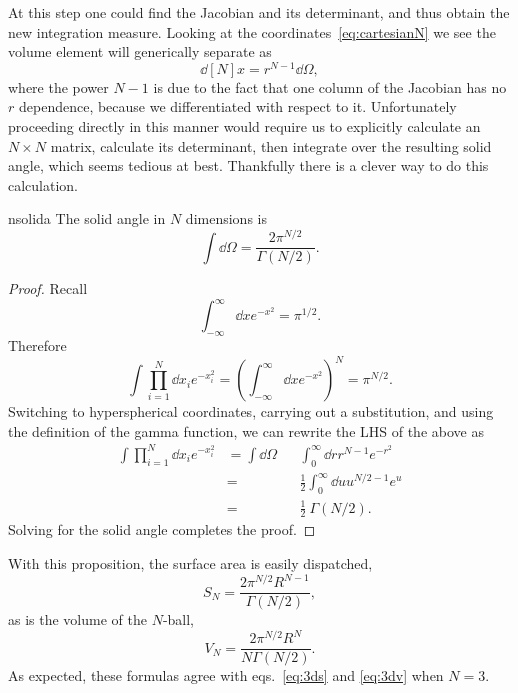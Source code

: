 At this step one could find the Jacobian and its determinant, and thus obtain
the new integration measure. Looking at the coordinates~\eqref{eq:cartesianN}
we see the volume element will generically separate as
\begin{equation}
  \dd[N]{x}=r^{N-1}\dd{\Omega},
\end{equation}
where the power $N-1$ is due to the fact that one column of the Jacobian has no
$r$ dependence, because we differentiated with respect to it. Unfortunately
proceeding directly in this manner would require us to explicitly calculate an
$N\times N$ matrix, calculate its determinant, then integrate over the
resulting solid angle, which seems tedious at best.
Thankfully there is a clever way to do this calculation. 

\begin{proposition}{}{nsolida}
The solid angle in $N$ dimensions is
$$
  \int\dd{\Omega}=\frac{2\pi^{N/2}}{\Gamma(N/2)}.
$$
\begin{proof}
  Recall 
  $$
    \int_{-\infty}^\infty\dd{x}e^{-x^2}=\pi^{1/2}.
  $$
  Therefore
  $$ 
    \int\prod_{i=1}^N\dd{x_i}e^{-x_i^2} 
      =\left(\int_{-\infty}^\infty\dd{x}e^{-x^2}\right)^N=\pi^{N/2}.
  $$
  Switching to hyperspherical coordinates, carrying out
  a substitution, and using the definition of the gamma function,
  we can rewrite the LHS of the above as
  \begin{equation*}\begin{aligned}
    \int\prod_{i=1}^N\dd{x_i}e^{-x_i^2}
       &=\int\dd{\Omega}&&\int_0^\infty\dd{r}r^{N-1}e^{-r^2}\\
       &=&&\frac{1}{2}\int_0^\infty\dd{u}u^{N/2-1}e^u\\
       &=&&\frac{1}{2}~\Gamma(N/2).
  \end{aligned}\end{equation*}
  Solving for the solid angle completes the proof. 
\end{proof}
\end{proposition}
With this proposition, the surface area is easily dispatched,
\begin{equation}
  S_N=\frac{2\pi^{N/2}R^{N-1}}{\Gamma(N/2)},
\end{equation}
as is the volume of the $N$-ball,
\begin{equation}
  V_N=\frac{2\pi^{N/2}R^N}{N\Gamma(N/2)}.
\end{equation}
As expected, these formulas agree with eqs.~\eqref{eq:3ds}
and \eqref{eq:3dv} when $N=3$.

